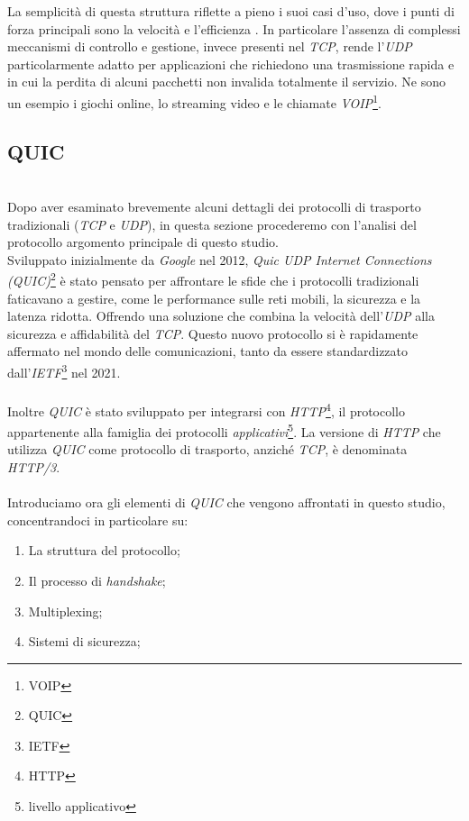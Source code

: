 \noindent La semplicità di questa struttura riflette a pieno i suoi casi d'uso, dove i punti di forza principali sono la velocità e l'efficienza \cite{site:udp}.
In particolare l'assenza di complessi meccanismi di controllo e gestione, invece presenti nel \emph{TCP}, rende l'\emph{UDP} particolarmente adatto per applicazioni che richiedono una trasmissione rapida e in cui la perdita di alcuni pacchetti non invalida totalmente il servizio.
Ne sono un esempio i giochi online, lo streaming video e le chiamate \emph{VOIP}\footnote{\gls{VOIP}}.

\subsection{QUIC}
~\\
\indent Dopo aver esaminato brevemente alcuni dettagli dei protocolli di trasporto tradizionali (\emph{TCP} e \emph{UDP}), in questa sezione procederemo con l'analisi del protocollo argomento principale di questo studio. 
\\
Sviluppato inizialmente da \emph{Google} nel 2012, \emph{Quic UDP Internet Connections (QUIC)}\footnote{\gls{QUIC}} è stato pensato per affrontare le sfide che i protocolli tradizionali faticavano a gestire, come le performance sulle reti mobili, la sicurezza e la latenza ridotta.
Offrendo una soluzione che combina la velocità dell'\emph{UDP} alla sicurezza e affidabilità del \emph{TCP}. Questo nuovo protocollo si è rapidamente affermato nel mondo delle comunicazioni, tanto da essere standardizzato dall'\emph{IETF}\footnote{\gls{IETF}} nel 2021.
\\\\
Inoltre \emph{QUIC} è stato sviluppato per integrarsi con \emph{HTTP}\footnote{\gls{HTTP}}, il protocollo appartenente alla famiglia dei protocolli \emph{applicativi}\footnote{\gls{livello applicativo}}. 
La versione di \emph{HTTP} che utilizza \emph{QUIC} come protocollo di trasporto, anziché \emph{TCP}, è denominata \emph{HTTP/3}.
\\\\
\noindent Introduciamo ora gli elementi di \emph{QUIC} che vengono affrontati in questo studio, concentrandoci in particolare su:
\begin{enumerate}
    \item La struttura del protocollo;
    \item Il processo di \emph{handshake};
    \item Multiplexing;
    \item Sistemi di sicurezza;
\end{enumerate}

